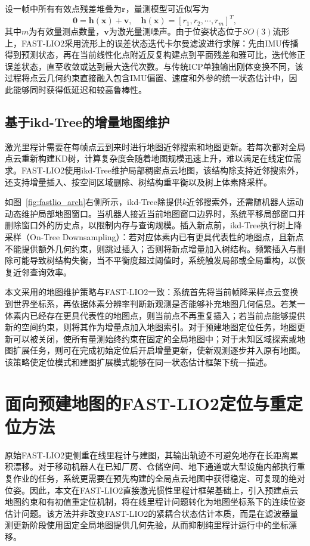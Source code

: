 设一帧中所有有效点残差堆叠为$\mathbf{r}$，量测模型可近似写为
\begin{equation}
    \mathbf{0}
    =
    \mathbf{h}(\mathbf{x})+\mathbf{v},
    \quad
    \mathbf{h}(\mathbf{x})=
    \left[r_{1},r_{2},\cdots,r_{m}\right]^{T},
    \label{eq:fastlio_measurement}
\end{equation}
其中$m$为有效量测点数量，$\mathbf{v}$为激光量测噪声。由于位姿状态位于$SO(3)$流形上，FAST-LIO2采用流形上的误差状态迭代卡尔曼滤波进行求解：先由IMU传播得到预测状态，再在当前线性化点附近反复构建点到平面残差和雅可比，迭代修正误差状态，直至收敛或达到最大迭代次数。与传统ICP单独输出刚体变换不同，该过程将点云几何约束直接融入包含IMU偏置、速度和外参的统一状态估计中，因此能够同时获得低延迟和较高鲁棒性。

\subsection{基于ikd-Tree的增量地图维护}
\label{subsec:ikdtree_maintenance}
激光里程计需要在每帧点云到来时进行地图近邻搜索和地图更新。若每次都对全局点云重新构建KD树，计算复杂度会随着地图规模迅速上升，难以满足在线定位需求。FAST-LIO2使用ikd-Tree维护局部稠密点云地图，该结构除支持近邻搜索外，还支持增量插入、按空间区域删除、树结构重平衡以及树上体素降采样。

如图~\ref{fig:fastlio_arch}右侧所示，ikd-Tree除提供$k$近邻搜索外，还需随机器人运动动态维护局部地图窗口。当机器人接近当前地图窗口边界时，系统平移局部窗口并删除窗口外的历史点，以限制内存与查询规模。插入新点前，ikd-Tree执行树上降采样（On-Tree Downsampling）：若对应体素内已有更具代表性的地图点，且新点不能提供额外几何约束，则跳过插入；否则将新点增量加入树结构。频繁插入与删除可能导致树结构失衡，当不平衡度超过阈值时，系统触发局部或全局重构，以恢复近邻查询效率。

本文采用的地图维护策略与FAST-LIO2一致：系统首先将当前帧降采样点云变换到世界坐标系，再依据体素分辨率判断新观测是否能够补充地图几何信息。若某一体素内已经存在更具代表性的地图点，则当前点不再重复插入；若当前点能够提供新的空间约束，则将其作为增量点加入地图索引。对于预建地图定位任务，地图更新可以被关闭，使所有量测始终约束在固定的全局地图中；对于未知区域探索或地图扩展任务，则可在完成初始定位后开启增量更新，使新观测逐步并入原有地图。该策略使定位模式和建图扩展模式能够在同一状态估计框架下统一描述。

\section{面向预建地图的FAST-LIO2定位与重定位方法}
\label{sec:prebuilt_map_localization}
原始FAST-LIO2更侧重在线里程计与建图，其输出轨迹不可避免地存在长距离累积漂移。对于移动机器人在已知厂房、仓储空间、地下通道或大型设施内部执行重复作业的任务，系统更需要在预先构建的全局点云地图中获得稳定、可复现的绝对位姿。因此，本文在FAST-LIO2直接激光惯性里程计框架基础上，引入预建点云地图约束和有初值重定位机制，将在线里程计问题转化为地图坐标系下的连续位姿估计问题。该方法并非改变FAST-LIO2的紧耦合状态估计本质，而是在滤波器量测更新阶段使用固定全局地图提供几何先验，从而抑制纯里程计运行中的坐标漂移。

